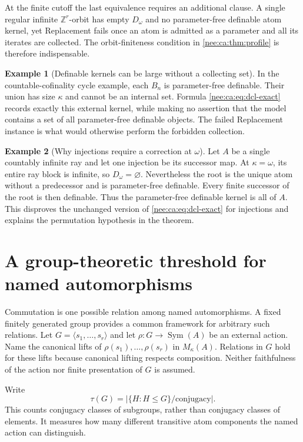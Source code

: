 \documentclass[11pt,letterpaper]{article}
\numberwithin{equation}{section}
\theoremstyle{plain}
\theoremstyle{definition}
\newtheorem{example}[example]{Example}
\theoremstyle{remark}
\newcommand{\Mk}{M_\kappa(A)}
\newcommand{\ZZ}{\mathbb Z}
\begin{document}
At the finite cutoff the last equivalence requires an additional clause. A single regular infinite $\ZZ^r$-orbit has empty $D_\omega$ and no parameter-free definable atom kernel, yet Replacement fails once an atom is admitted as a parameter and all its iterates are collected. The orbit-finiteness condition in \cref{nee:ca:thm:profile} is therefore indispensable.

\begin{example}[Definable kernels can be large without a collecting set]
In the countable-cofinality cycle example, each $B_n$ is parameter-free definable. Their union has size $\kappa$ and cannot be an internal set. Formula \eqref{nee:ca:eq:dcl-exact} records exactly this external kernel, while making no assertion that the model contains a set of all parameter-free definable objects. The failed Replacement instance is what would otherwise perform the forbidden collection.
\end{example}

\begin{example}[Why injections require a correction at $\omega$]\label{nee:ca:ex:ray-dcl}
Let $A$ be a single countably infinite ray and let one injection be its successor map. At $\kappa=\omega$, its entire ray block is infinite, so $D_\omega=\varnothing$. Nevertheless the root is the unique atom without a predecessor and is parameter-free definable. Every finite successor of the root is then definable. Thus the parameter-free definable kernel is all of $A$. This disproves the unchanged version of \eqref{nee:ca:eq:dcl-exact} for injections and explains the permutation hypothesis in the theorem.
\end{example}

\section{A group-theoretic threshold for named automorphisms}
\label{nee:ca:grp:section}

Commutation is one possible relation among named automorphisms.  A fixed
finitely generated group provides a common framework for arbitrary such
relations.  Let $G=\langle s_1,\ldots,s_r\rangle$ and let
$\rho:G\to\operatorname{Sym}(A)$ be an external action.  Name the canonical
lifts of $\rho(s_1),\ldots,\rho(s_r)$ in $\Mk$.  Relations in $G$ hold for
these lifts because canonical lifting respects composition.  Neither
faithfulness of the action nor finite presentation of $G$ is assumed.

Write
\begin{equation}\label{nee:ca:grp:eq:tau}
 \tau(G)=\bigl|\{H:H\leq G\}/\text{conjugacy}\bigr|.
\end{equation}
This counts conjugacy classes of subgroups, rather than conjugacy classes
of elements.  It measures how many different transitive atom components
the named action can distinguish.
\end{document}
